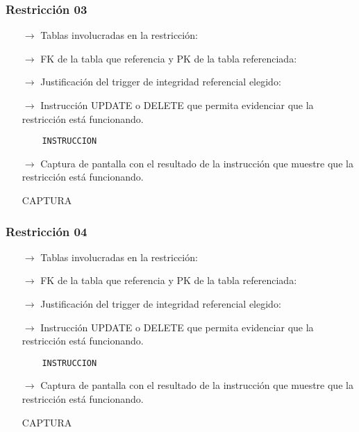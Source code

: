 \subsubsection*{Restricción 03}

\begin{itemize}
    \item[$\rightarrow$] Tablas involucradas en la restricción: 
    \item[$\rightarrow$] FK de la tabla que referencia y PK de la tabla referenciada: 
    \item[$\rightarrow$] Justificación del trigger de integridad referencial elegido: 
    \item[$\rightarrow$] Instrucción UPDATE o DELETE que permita evidenciar que la restricción está
    funcionando.
    \begin{verbatim}
    INSTRUCCION
    \end{verbatim}
    \item[$\rightarrow$] Captura de pantalla con el resultado de la instrucción que muestre que la restricción está
    funcionando.
    \begin{center}
        CAPTURA
    \end{center}
\end{itemize}

\subsubsection*{Restricción 04}

\begin{itemize}
    \item[$\rightarrow$] Tablas involucradas en la restricción: 
    \item[$\rightarrow$] FK de la tabla que referencia y PK de la tabla referenciada: 
    \item[$\rightarrow$] Justificación del trigger de integridad referencial elegido: 
    \item[$\rightarrow$] Instrucción UPDATE o DELETE que permita evidenciar que la restricción está
    funcionando.
    \begin{verbatim}
    INSTRUCCION
    \end{verbatim}
    \item[$\rightarrow$] Captura de pantalla con el resultado de la instrucción que muestre que la restricción está
    funcionando.
    \begin{center}
        CAPTURA
    \end{center}
\end{itemize}


